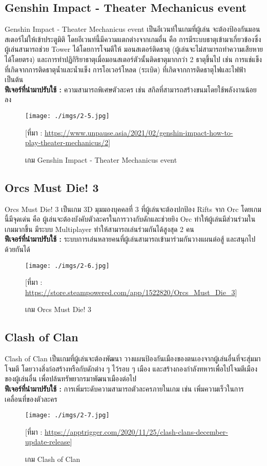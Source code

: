 \documentclass[12pt,oneside,openright,a4paper]{cpe-thai-project}
\begin{document}
\subsection{Genshin Impact - Theater Mechanicus event}
Genshin Impact - Theater Mechanicus event เป็นอีเวนท์ในเกมที่ผู้เล่น
จะต้องป้องกันมอนสเตอร์ไม่ให้เข้าประตูมิติ โดยอีเวนท์นี้มีความแตกต่างจากเกมอื่น 
คือ การมีระบบธาตุเข้ามาเกี่ยวข้องซึ่งผู้เล่นสามารถช่วย Tower ได้โดยการโจมตีให้
มอนสเตอร์ติดธาตุ (ผู้เล่นจะไม่สามารถทำความเสียหายได้โดยตรง) 
และการทำปฏิกิริยาธาตุเมื่อมอนสเตอร์ตัวนั้นติดธาตุมากกว่า 2 ธาตุขึ้นไป เช่น 
การแช่แข็งที่เกิดจากการติดธาตุน้ำและน้ำแข็ง การโอเวอร์โหลด (ระเบิด) ที่เกิดจากการติดธาตุไฟและไฟฟ้า เป็นต้น\\
\textbf{ฟีเจอร์ที่นำมาปรับใช้ : } ความสามารถพิเศษตัวละคร เช่น สกิลที่สามารถสร้างขนมโดยใช้พลังงานน้อยลง
\begin{figure}[H]\centering
  \texttt{[image: ./imgs/2-5.jpg]}
  \caption{เกม Genshin Impact - Theater Mechanicus event}\label{fig:2-5}
  \small [ที่มา : \url{https://www.unpause.asia/2021/02/genshin-impact-how-to-play-theater-mechanicus/2}]
\end{figure}

\pagebreak
\subsection{Orcs Must Die! 3}
Orcs Must Die! 3 เป็นเกม 3D มุมมองบุคคลที่ 3 ที่ผู้เล่นจะต้องปกป้อง Rifts จาก Orc โดยเกมนี้มีจุดเด่น คือ 
ผู้เล่นจะต้องบังคับตัวละครในการวางกับดักและช่วยยิง Orc ทำให้ผู้เล่นมีส่วนร่วมในเกมมากขึ้น มีระบบ Multiplayer 
ทำให้สามารถเล่นร่วมกันได้สูงสุด 2 คน\\
\textbf{ฟีเจอร์ที่นำมาปรับใช้ : } ระบบการเล่นหลายคนที่ผู้เล่นสามารถเข้ามาร่วมกันวางแผนต่อสู้ และสนุกไปด้วยกันได้
\begin{figure}[H]\centering
  \texttt{[image: ./imgs/2-6.jpg]}
  \caption{เกม Orcs Must Die! 3}\label{fig:2-6}
  \small [ที่มา : \url{https://store.steampowered.com/app/1522820/Orcs_Must_Die_3}]
\end{figure}

\subsection{Clash of Clan}
Clash of Clan เป็นเกมที่ผู้เล่นจะต้องพัฒนา วางแผนป้องกันเมืองของตนเองจากผู้เล่นอื่นที่จะสุ่มมาโจมตี 
โดยวางสิ่งก่อสร้างหรือกับดักต่าง ๆ ไว้รอบ ๆ เมือง และสร้างกองกำลังทหารเพื่อไปโจมตีเมืองของผู้เล่นอื่น
เพื่อปล้นทรัพยากรมาพัฒนาเมืองต่อไป\\
\textbf{ฟีเจอร์ที่นำมาปรับใช้ : } การเพิ่มระดับความสามารถตัวละครภายในเกม เช่น 
เพิ่มความเร็วในการเคลื่อนที่ของตัวละคร
\begin{figure}[H]\centering
  \texttt{[image: ./imgs/2-7.jpg]}
  \caption{เกม Clash of Clan}\label{fig:2-7}
  \small [ที่มา : \url{https://apptrigger.com/2020/11/25/clash-clans-december-update-release}]
\end{figure}
\end{document}
